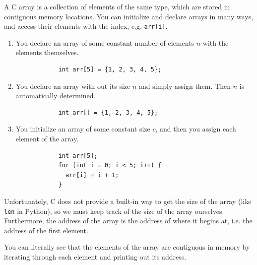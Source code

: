 \documentclass{article}
\begin{document}
    \begin{definition}[Array]
      A C array is a collection of elements of the same type, which are stored in contiguous memory locations. You can initialize and declare arrays in many ways, and access their elements with the index, e.g. \texttt{arr[i]}.
      \begin{enumerate}
        \item You declare an array of some constant number of elements $n$ with the elements themselves. 
          \begin{lstlisting} 
            int arr[5] = {1, 2, 3, 4, 5}; 
          \end{lstlisting}
        \item You declare an array with out its size $n$ and simply assign them. Then $n$ is automatically determined. 
          \begin{lstlisting} 
            int arr[] = {1, 2, 3, 4, 5}; 
          \end{lstlisting}
        \item You initialize an array of some constant size $c$, and then you assign each element of the array. 
          \begin{lstlisting} 
            int arr[5]; 
            for (int i = 0; i < 5; i++) {
              arr[i] = i + 1; 
            }
          \end{lstlisting}
      \end{enumerate}
      Unfortunately, C does not provide a built-in way to get the size of the array (like \texttt{len} in Python), so we must keep track of the size of the array ourselves. Furthermore, the address of the array is the address of where it begins at, i.e. the address of the first element. 
    \end{definition}

    You can literally see that the elements of the array are contiguous in memory by iterating through each element and printing out its address. 
\end{document}
